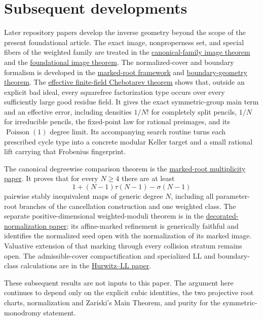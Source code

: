 \section{Subsequent developments}\label{sec:further}

Later repository papers develop the inverse geometry beyond the scope of the
present foundational article.  The exact image, nonproperness set, and
special fibers of the weighted family are treated in the
\href{../../extended-geometry/CANONICAL_FAMILY_IMAGE.md}{canonical-family image theorem}
and the \href{../../verified/IMAGE_AND_NONPROPERNESS.md}{foundational image theorem}.
The normalized-cover and boundary formalism is developed in the
\href{../../MARKED_ROOT_KELLER_MAPS.md}{marked-root framework} and
\href{../../cancellation/BOUNDARY_GEOMETRY.md}{boundary-geometry theorem}.
The \href{../../extended-geometry/FINITE_FIELD_CHEBOTAREV.md}{effective
finite-field Chebotarev theorem} shows that, outside an explicit bad ideal,
every squarefree factorization type occurs over every sufficiently large
good residue field.  It gives the exact symmetric-group main term and an
effective error, including densities $1/N!$ for completely split pencils,
$1/N$ for irreducible pencils, the fixed-point law for rational preimages,
and its $\operatorname{Poisson}(1)$ degree limit.  Its accompanying search
routine turns each prescribed cycle type into a concrete modular Keller
target and a small rational lift carrying that Frobenius fingerprint.

The canonical degreewise comparison theorem is the
\href{../marked-root-multiplicity/main.tex}{marked-root multiplicity paper}.
It proves that for every
$N\ge4$ there are at least
\[
 1+(N-1)\tau(N-1)-\sigma(N-1)
\]
pairwise stably inequivalent maps of generic degree $N$, including all
parameter-root branches of the cancellation construction and one weighted
class.  The separate positive-dimensional weighted-moduli theorem is in the
\href{../../papers/decorated-discriminant-normalization/main.tex}{decorated-normalization paper};
its affine-marked refinement is generically faithful and identifies the
normalized seed open with the normalization of its marked image.  Valuative
extension of that marking through every collision stratum remains open.  The
admissible-cover compactification and specialized LL and boundary-class
calculations are in the
\href{../../papers/hurwitz-ll-rerooting/main.tex}{Hurwitz--LL paper}.

These subsequent results are not inputs to this paper.  The argument here
continues to depend only on the explicit cubic identities, the two projective
root charts, normalization and Zariski's Main Theorem, and purity for the
symmetric-monodromy statement.
